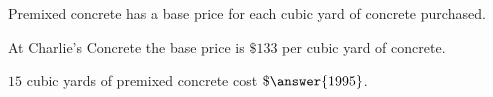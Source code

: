 \documentclass{ximera}
\author{Alan Yang}
\begin{document}
Premixed concrete has a base price for each cubic yard of concrete purchased.


At Charlie's Concrete the base price is $\$133$ per cubic yard of concrete.




\begin{exercise}

$15$ cubic yards of premixed concrete cost $\$\answer{1995}$.



\end{exercise}
\end{document}
